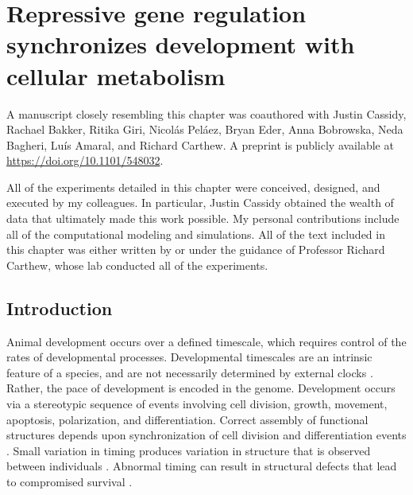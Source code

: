 \graphicspath{ {figures/metabolism/} }


\chapter{Repressive gene regulation synchronizes development with cellular metabolism}
\label{ch:metabolism}

A manuscript closely resembling this chapter was coauthored with Justin Cassidy, Rachael Bakker, Ritika Giri, Nicol\'{a}s Pel\'{a}ez, Bryan Eder, Anna Bobrowska, Neda Bagheri, Lu\'{i}s Amaral, and Richard Carthew. A preprint is publicly available at \url{https://doi.org/10.1101/548032}. 

All of the experiments detailed in this chapter were conceived, designed, and executed by my colleagues. In particular, Justin Cassidy obtained the wealth of data that ultimately made this work possible. My personal contributions include all of the computational modeling and simulations. All of the text included in this chapter was either written by or under the guidance of Professor Richard Carthew, whose lab conducted all of the experiments.


\section{Introduction}

Animal development occurs over a defined timescale, which requires control of the rates of developmental processes. Developmental timescales are an intrinsic feature of a species, and are not necessarily determined by external clocks \cite{Ebisuya2018}. Rather, the pace of development is encoded in the genome. Development occurs via a stereotypic sequence of events involving cell division, growth, movement, apoptosis, polarization, and differentiation. Correct assembly of functional structures depends upon synchronization of cell division and differentiation events \cite{Foe1989,Sulston1983}. Small variation in timing produces variation in structure that is observed between individuals \cite{Francesconi2014,Poullet2016}. Abnormal timing can result in structural defects that lead to compromised survival \cite{Moss2007}.

